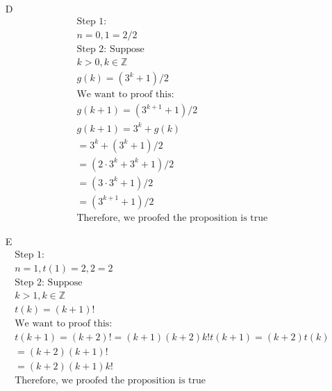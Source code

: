 \documentclass[12pt]{article}
\begin{document}
\begin{itemize}
\begin{equation*}
\begin{split}
		\end{split}
	\end{equation*}
    \item [D]
	\begin{equation*}
		\begin{split}
		    \text{Step 1:}\\
		    n = 0, 1 = 2/2\\
		    \text{Step 2: Suppose}\\
		    k > 0, k \in \mathbb{Z}\\
		    g(k) = (3^k + 1)/2\\
		    \text{We want to proof this:}\\
		    g(k+1) = (3^{k+1} + 1)/2\\
		    g(k+1) = 3^{k}+g(k)\\
		    = 3^k + (3^k + 1)/2\\
		    = (2\cdot 3^k + 3^k + 1)/2\\
		    = (3\cdot 3^k + 1)/2\\
		    = (3^{k+1} + 1)/2\\
		    \text{Therefore, we proofed the proposition is true}
		\end{split}
	\end{equation*}
    \item [E]
	\begin{equation*}
		\begin{split}
		    \text{Step 1:}\\
		    n = 1, t(1) = 2, 2=2\\
		    \text{Step 2: Suppose}\\
		    k > 1, k \in \mathbb{Z}\\
		    t(k) = (k+1)!\\
		    \text{We want to proof this:}\\
		    t(k+1) = (k+2)! = (k+1)(k+2)k!
		    t(k+1) = (k+2)t(k)\\
		    = (k+2)(k+1)!\\
		    = (k+2)(k+1)k!\\
		    \text{Therefore, we proofed the proposition is true}
		\end{split}
	\end{equation*}
\end{itemize}
\end{document}

